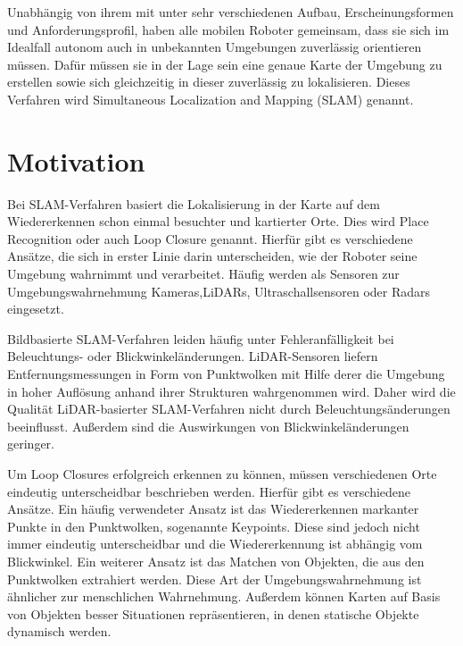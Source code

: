 
Unabhängig von ihrem mit unter sehr verschiedenen Aufbau, Erscheinungsformen und Anforderungsprofil, haben alle mobilen Roboter gemeinsam, dass sie sich im Idealfall autonom auch in unbekannten Umgebungen zuverlässig orientieren müssen. Dafür müssen sie in der Lage sein eine genaue Karte der Umgebung zu erstellen sowie sich gleichzeitig in dieser zuverlässig zu lokalisieren. Dieses Verfahren wird %
Simultaneous Localization and Mapping (SLAM) genannt. 

\section[Motivation (Schmelzer)]{Motivation}

Bei SLAM-Verfahren basiert die Lokalisierung in der Karte auf dem Wiedererkennen schon einmal besuchter und kartierter Orte. Dies wird Place Recognition oder auch Loop Closure genannt. Hierfür gibt es verschiedene Ansätze, die sich in erster Li\-nie darin unterscheiden, wie der Roboter seine Umgebung wahrnimmt und verarbeitet. Häufig werden als Sensoren zur Umgebungswahrnehmung Kameras,LiDARs, Ultraschallsensoren oder Radars eingesetzt. 

Bildbasierte SLAM-Verfahren leiden häufig unter Fehleranfälligkeit bei Beleuchtungs- oder Blickwinkeländerungen. LiDAR-Sensoren liefern Entfernungsmessungen in Form von Punktwolken mit Hilfe derer die Umgebung in hoher Auflösung anhand ihrer Strukturen wahrgenommen wird. Daher wird die Qualität LiDAR-basierter SLAM-Verfahren nicht durch Beleuchtungsänderungen beeinflusst. Außerdem sind die Auswirkungen von Blickwinkeländerungen geringer.  

Um Loop Closures erfolgreich erkennen zu können, müssen  verschiedenen Orte eindeutig unterscheidbar beschrieben werden. Hierfür gibt es verschiedene Ansätze. Ein häufig verwendeter Ansatz ist das Wiedererkennen markanter Punkte in den Punkt\-wol\-ken, sogenannte Keypoints. Diese sind jedoch nicht immer eindeutig unterscheidbar und die Wiedererkennung ist abhängig vom Blickwinkel. Ein weiterer Ansatz ist das Matchen von Objekten, die aus den Punktwolken extrahiert werden. Diese Art der Umgebungswahrnehmung ist ähnlicher zur menschlichen Wahrnehmung. Außerdem können Karten auf Basis von Objekten besser Situationen repräsentieren, in denen statische Objekte dynamisch werden. 

